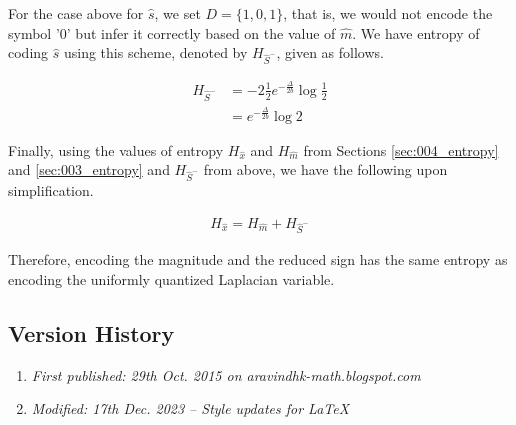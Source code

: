 For the case above for $\hat{s}$, we set $D = \{1, 0, 1\}$, that is, we would not encode the symbol '0' but infer it correctly based on the value of $\hat{m}$. We have entropy of coding $\hat{s}$ using this scheme, denoted by $H_{\hat{S}^-}$, given as follows.

\begin{align}H_{\hat{S}^-} &= -2\frac{1}{2} e^{-\frac{\Delta}{2b}} \log \frac{1}{2}\nonumber\\ &= e^{-\frac{\Delta}{2b}} \log 2\end{align}

Finally, using the values of entropy $H_{\hat{x}}$ and $H_{\hat{m}}$ from Sections \ref{sec:004_entropy} and \ref{sec:003_entropy} and $H_{\hat{S}^-}$ from above, we have the following upon simplification.

\begin{align}H_{\hat{x}} = H_{\hat{m}} + H_{\hat{S}^-}\end{align}

Therefore, encoding the magnitude and the reduced sign has the same entropy as encoding the uniformly quantized Laplacian variable.

\subsection{Version History}
\begin{enumerate}
	\item \emph{First published: 29th Oct. 2015 on aravindhk-math.blogspot.com}
	\item \emph{Modified: 17th Dec. 2023 -- Style updates for \LaTeX}
\end{enumerate}

